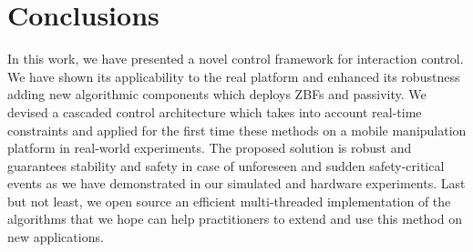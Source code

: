 \section{Conclusions} \label{sec:conclusions}

In this work, we have presented a novel control framework for interaction control. We have shown its applicability to the real platform and enhanced its robustness adding new algorithmic components which deploys ZBFs and passivity. We devised a cascaded control architecture which takes into account real-time constraints and applied for the first time these methods on a mobile manipulation platform in real-world experiments. The proposed solution is robust and guarantees stability and safety in case of unforeseen and sudden safety-critical events as we have demonstrated in our simulated and hardware experiments. Last but not least, we open source an efficient multi-threaded implementation of the algorithms that we hope can help practitioners to extend and use this method on new applications.


